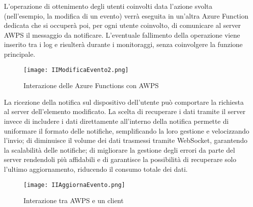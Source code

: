 L’operazione di ottenimento degli utenti coinvolti data l’azione svolta (nell’esempio, la modifica di un evento) verrà eseguita in un’altra Azure Function dedicata che si occuperà poi, per ogni utente coinvolto, di comunicare  al server AWPS il messaggio da notificare. L’eventuale fallimento della operazione viene inserito tra i log e risulterà durante i monitoraggi, senza coinvolgere la funzione principale.

		
\begin{figure}[h!]
    \centering
    \texttt{[image: IIModificaEvento2.png]}
    \caption{Interazione delle Azure Functions con AWPS}
\end{figure}	

La ricezione della notifica sul dispositivo dell’utente può comportare la richiesta al server dell’elemento modificato. La scelta di recuperare i dati tramite il server invece di includere i dati direttamente all’interno della notifica permette di uniformare il formato delle notifiche, semplificando la loro gestione e velocizzando l'invio; di diminuisce il volume dei dati trasmessi tramite WebSocket, garantendo la scalabilità delle notifiche; di migliorare la gestione degli errori da parte del server rendendoli più affidabili e di garantisce la possibilità di recuperare solo l’ultimo aggiornamento, riducendo il consumo totale dei dati.


\begin{figure}[h!]
    \centering
    \texttt{[image: IIAggiornaEvento.png]}
    \caption{Interazione tra AWPS e un client}
\end{figure}	

\clearpage